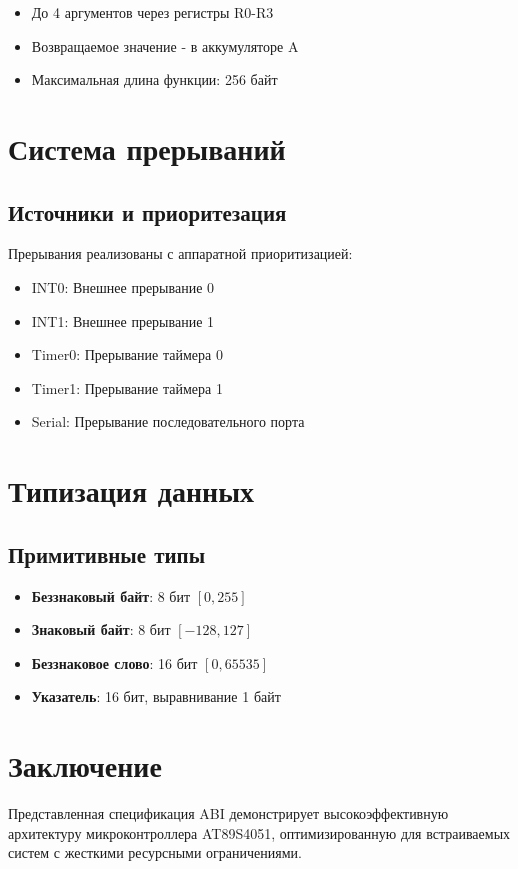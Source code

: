 \documentclass{article}
\begin{document}
\begin{itemize}
    \item До 4 аргументов через регистры R0-R3
    \item Возвращаемое значение - в аккумуляторе A
    \item Максимальная длина функции: 256 байт
\end{itemize}

\section{Система прерываний}
\subsection{Источники и приоритезация}
Прерывания реализованы с аппаратной приоритизацией:

\begin{itemize}
    \item INT0: Внешнее прерывание 0
    \item INT1: Внешнее прерывание 1
    \item Timer0: Прерывание таймера 0
    \item Timer1: Прерывание таймера 1
    \item Serial: Прерывание последовательного порта
\end{itemize}

\section{Типизация данных}
\subsection{Примитивные типы}
\begin{itemize}
    \item \textbf{Беззнаковый байт}: 8 бит $[0, 255]$
    \item \textbf{Знаковый байт}: 8 бит $[-128, 127]$
    \item \textbf{Беззнаковое слово}: 16 бит $[0, 65535]$
    \item \textbf{Указатель}: 16 бит, выравнивание 1 байт
\end{itemize}

\section{Заключение}
Представленная спецификация ABI демонстрирует высокоэффективную архитектуру микроконтроллера AT89S4051, оптимизированную для встраиваемых систем с жесткими ресурсными ограничениями.
\end{document}
